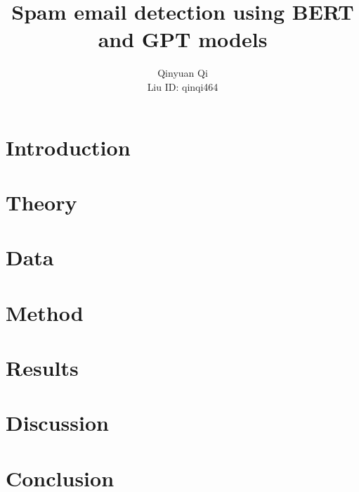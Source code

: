 \documentclass[11pt]{article}
\title{Spam email detection using BERT and GPT models}
\author{Qinyuan Qi \\
  Liu ID: qinqi464 \\
}
\begin{document}
\maketitle
\begin{abstract}

\end{abstract}

\section{Introduction}


\section{Theory}


\section{Data}


\section{Method}


\section{Results}


\section{Discussion}


\section{Conclusion}
 

%


\appendix
\end{document}
